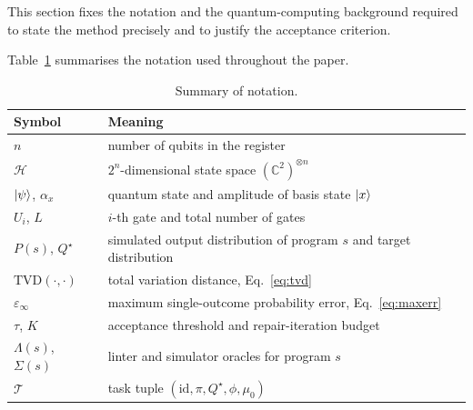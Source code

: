 \documentclass[11pt,a4paper]{article}
\newcommand{\tvd}{\mathrm{TVD}}
\begin{document}
This section fixes the notation and the quantum-computing background required to state the method precisely and to justify the acceptance criterion.

Table~\ref{tab:notation} summarises the notation used throughout the paper.

\begin{table}[H]
\centering
\caption{Summary of notation.}
\label{tab:notation}
\small
\begin{tabular}{@{}ll@{}}
\toprule
\textbf{Symbol} & \textbf{Meaning} \\
\midrule
$n$ & number of qubits in the register \\
$\mathcal{H}$ & $2^n$-dimensional state space $(\mathbb{C}^2)^{\otimes n}$ \\
$\ket{\psi}$, $\alpha_x$ & quantum state and amplitude of basis state $\ket{x}$ \\
$U_i$, $L$ & $i$-th gate and total number of gates \\
$P(s)$, $Q^\star$ & simulated output distribution of program $s$ and target distribution \\
$\tvd(\cdot,\cdot)$ & total variation distance, Eq.~\eqref{eq:tvd} \\
$\varepsilon_\infty$ & maximum single-outcome probability error, Eq.~\eqref{eq:maxerr} \\
$\tau$, $K$ & acceptance threshold and repair-iteration budget \\
$\Lambda(s)$, $\Sigma(s)$ & linter and simulator oracles for program $s$ \\
$\mathcal{T}$ & task tuple $(\text{id},\pi,Q^\star,\phi,\mu_0)$ \\
\bottomrule
\end{tabular}
\end{table}
\end{document}
